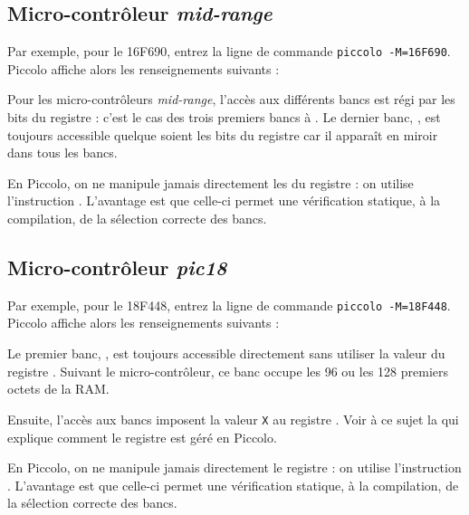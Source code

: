 \subsection{Micro-contrôleur \emph{mid-range}}

Par exemple, pour le 16F690, entrez la ligne de commande \texttt{piccolo -M=16F690}. Piccolo affiche alors les renseignements suivants :



Pour les micro-contrôleurs \emph{mid-range}, l'accès aux différents bancs est régi par les bits  du registre  : c'est le cas des trois premiers bancs  à . Le dernier banc, , est toujours accessible quelque soient les bits  du registre  car il apparaît en miroir dans tous les bancs.

En Piccolo, on ne manipule jamais directement les  du registre  : on utilise l'instruction . L'avantage est que celle-ci permet une vérification statique, à la compilation, de la sélection correcte des bancs.


\subsection{Micro-contrôleur \emph{pic18}}

Par exemple, pour le 18F448, entrez la ligne de commande \texttt{piccolo -M=18F448}. Piccolo affiche alors les renseignements suivants :



Le premier banc, , est toujours accessible directement sans utiliser la valeur du registre . Suivant le micro-contrôleur, ce banc occupe les 96 ou les 128 premiers octets de la RAM.

Ensuite, l'accès aux bancs  imposent la valeur \texttt{X} au registre . Voir à ce sujet la  qui explique comment le registre  est géré en Piccolo.

En Piccolo, on ne manipule jamais directement le registre  : on utilise l'instruction . L'avantage est que celle-ci permet une vérification statique, à la compilation, de la sélection correcte des bancs.







